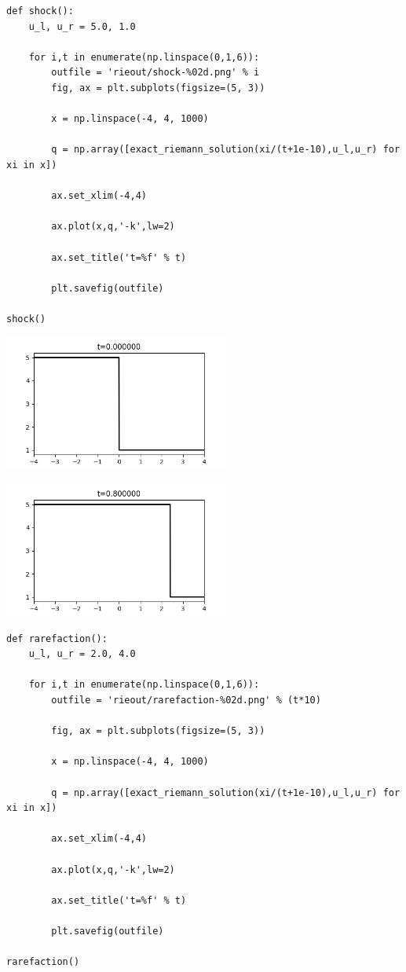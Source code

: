 \documentclass[12pt,fleqn]{article}\usepackage{../../common}
\begin{document}
\begin{verbatim}
def shock():
    u_l, u_r = 5.0, 1.0

    for i,t in enumerate(np.linspace(0,1,6)):
        outfile = 'rieout/shock-%02d.png' % i
        fig, ax = plt.subplots(figsize=(5, 3))
                    
        x = np.linspace(-4, 4, 1000)
        
        q = np.array([exact_riemann_solution(xi/(t+1e-10),u_l,u_r) for xi in x])

        ax.set_xlim(-4,4)

        ax.plot(x,q,'-k',lw=2)

        ax.set_title('t=%f' % t)
    
        plt.savefig(outfile)

shock() 
\end{verbatim}


\includegraphics[width=20em]{rieout/shock-00.png}

\includegraphics[width=20em]{rieout/shock-04.png}


\begin{verbatim}        
def rarefaction():
    u_l, u_r = 2.0, 4.0
    
    for i,t in enumerate(np.linspace(0,1,6)):
        outfile = 'rieout/rarefaction-%02d.png' % (t*10)

        fig, ax = plt.subplots(figsize=(5, 3))
                    
        x = np.linspace(-4, 4, 1000)
        
        q = np.array([exact_riemann_solution(xi/(t+1e-10),u_l,u_r) for xi in x])

        ax.set_xlim(-4,4)

        ax.plot(x,q,'-k',lw=2)
    
        ax.set_title('t=%f' % t)

        plt.savefig(outfile)

rarefaction()
\end{verbatim}
\end{document}
